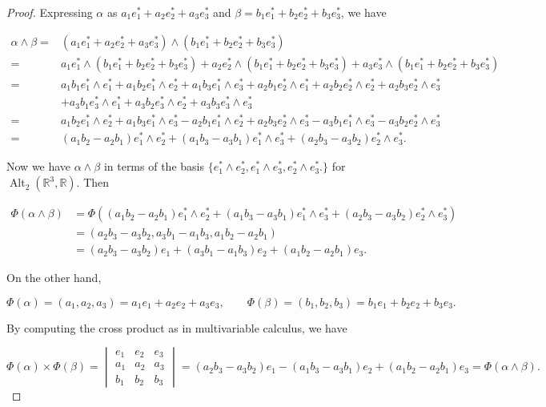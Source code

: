 \begin{proof}

Expressing \(\alpha\) as \(a_1 e_1^* + a_2 e_2^* + a_3 e_3^*\) and \(\beta = b_1 e_1^* + b_2 e_2^* + b_3 e_3^*\), we have

\begin{align*}
\alpha \wedge \beta  =& (a_1 e_1^* + a_2 e_2^* + a_3 e_3^*) \wedge ( b_1 e_1^* + b_2 e_2^* + b_3 e_3^*)
\\  =& a_1 e_1^*   \wedge ( b_1 e_1^* + b_2 e_2^* + b_3 e_3^*)
+ a_2 e_2^* \wedge ( b_1 e_1^* + b_2 e_2^* + b_3 e_3^*)
+ a_3 e_3^*  \wedge ( b_1 e_1^* + b_2 e_2^* + b_3 e_3^*)
\\  = &  a_1 b_1e_1^*   \wedge  e_1^* + a_1 b_2 e_1^*   \wedge  e_2^* + a_1 b_3 e_1^*   \wedge e_3^*
+   a_2 b_1e_2^* \wedge  e_1^* +  a_2 b_2 e_2^* \wedge  e_2^* +  a_2b_3 e_2^* \wedge  e_3^*
\\ & +   a_3 b_1 e_3^*  \wedge  e_1^* +   a_3 b_2 e_3^*  \wedge  e_2^* +  a_3 b_3 e_3^*  \wedge   e_3^*
\\  = &    a_1 b_2 e_1^*   \wedge  e_2^* + a_1 b_3 e_1^*   \wedge e_3^*
-    a_2 b_1e_1^* \wedge  e_2^* +  a_2b_3 e_2^* \wedge  e_3^*
 -   a_3 b_1 e_1^*  \wedge  e_3^* -   a_3 b_2 e_2^*  \wedge  e_3^* 
 \\  = &    (a_1 b_2 -    a_2 b_1) e_1^*   \wedge  e_2^* + (a_1 b_3  -   a_3 b_1) e_1^*   \wedge e_3^*
 + ( a_2b_3  -   a_3 b_2 ) e_2^* \wedge  e_3^*.
\end{align*}

Now we have \(\alpha \wedge \beta\) in terms of the basis \(\{ e_1^*   \wedge  e_2^*, e_1^*   \wedge e_3^*, e_2^* \wedge  e_3^*.\}\) for \(\operatorname{Alt}_2(\mathbb{R}^3, \mathbb{R})\). Then

\begin{align*}
\Phi(\alpha \wedge \beta)  & = \Phi\left(  (a_1 b_2 -    a_2 b_1) e_1^*   \wedge  e_2^* + (a_1 b_3  -   a_3 b_1) e_1^*   \wedge e_3^*
 + ( a_2b_3  -   a_3 b_2 ) e_2^* \wedge  e_3^* \right) 
 \\ & = \left(a_2b_3  -   a_3 b_2  , a_3 b_1 - a_1 b_3, a_1 b_2 -    a_2 b_1 \right) 
 \\ & = (a_2b_3  -   a_3 b_2 )e_1 + (a_3 b_1 - a_1 b_3)e_2 + (a_1 b_2 -    a_2 b_1) e_3.
\end{align*}

On the other hand,

\[
\Phi(\alpha) = (a_1, a_2, a_3) = a_1 e_1  + a_2 e_2 + a_3 e_3, \qquad \Phi(\beta) = (b_1, b_2, b_3) = b_1 e_1  + b_2 e_2 + b_3 e_3.
\]

By computing the cross product as in multivariable calculus, we have

\[
\Phi(\alpha) \times \Phi(\beta) = \begin{vmatrix}
e_1 & e_2 & e_3 \\
a_1  & a_2  & a_3  \\
b_1   & b_2  & b_3 
\end{vmatrix} = (a_2 b_3 - a_3 b_2) e_1 - (a_1 b_3 - a_3 b_1) e_2 + (a_1 b_2 - a_2 b_1) e_3 = \Phi(\alpha \wedge \beta).
\]

\end{proof}






